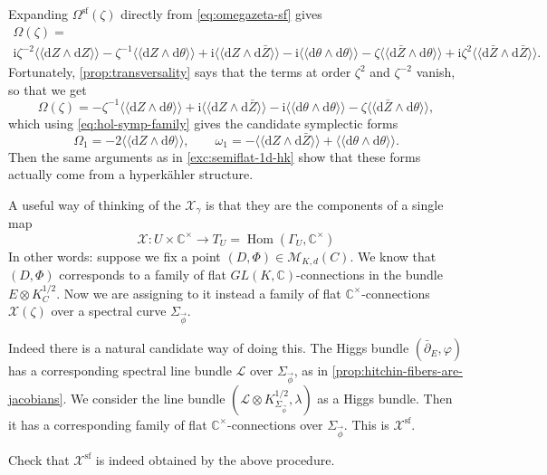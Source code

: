 \documentclass[12pt,letterpaper,reqno]{article}
\numberwithin{equation}{section}
\newcommand{\cL}{\ensuremath{\mathcal L}}
\newcommand{\cM}{\ensuremath{\mathcal M}}
\newcommand{\cX}{\ensuremath{\mathcal X}}
\newcommand{\C}{\ensuremath{\mathbb C}}
\newcommand{\hk}{hyperk\"ahler\xspace}
\newcommand{\I}{{\mathrm i}}
\newcommand{\de}{\mathrm{d}}
\renewcommand{\sf}{\mathrm{sf}}
\newcommand{\DIP}[1]{\langle\!\langle#1\rangle\!\rangle}
\DeclareMathOperator{\Hom}{Hom}
\begin{document}
\begin{pf}
Expanding $\Omega^\sf(\zeta)$ directly from \eqref{eq:omegazeta-sf} gives
\begin{multline}
  \Omega(\zeta) = \\ \I \zeta^{-2} \DIP{\de Z \wedge \de Z} - \zeta^{-1} \DIP{\de Z \wedge \de \theta} + \I \DIP{\de Z \wedge \de \bar{Z}} - \I \DIP{\de \theta \wedge \de \theta} - \zeta \DIP{\de \bar{Z} \wedge \de \theta} + \I \zeta^2 \DIP{\de \bar{Z} \wedge \de \bar{Z}}.
\end{multline}
Fortunately, \autoref{prop:transversality} says that the terms
at order $\zeta^2$ and $\zeta^{-2}$ vanish, so that we get
\begin{equation}
  \Omega(\zeta) = - \zeta^{-1} \DIP{\de Z\wedge \de \theta} + \I \DIP{\de Z\wedge \de \bar{Z}} - \I \DIP{\de \theta\wedge \de \theta} - \zeta \DIP{\de \bar{Z} \wedge \de \theta},
\end{equation}
which using \eqref{eq:hol-symp-family} gives the candidate symplectic forms
\begin{equation}
  \Omega_1 = -2 \DIP{\de Z \wedge \de \theta}, \qquad \omega_1 = - \DIP{\de Z \wedge \de \bar{Z}} + \DIP{\de \theta \wedge \de \theta}.
\end{equation}
Then the same arguments as in \autoref{exc:semiflat-1d-hk}
show that these forms actually come from a \hk structure.
\end{pf}

A useful way of thinking of the $\cX_\gamma$ is that they are the components
of a single map
\begin{equation}
   \cX: U \times \C^\times \to T_U = \Hom(\Gamma_U, \C^\times)
\end{equation}
In other words: suppose we fix a point $(D,\Phi) \in \cM_{K,d}(C)$.
We know that $(D,\Phi)$ corresponds to a family of flat $GL(K,\C)$-connections
in the bundle $E \otimes K_C^{1/2}$. Now we are assigning to it
instead a family of flat $\C^\times$-connections
$\cX(\zeta)$ over a spectral curve $\Sigma_{\vec\phi}$.

Indeed there is a natural candidate way of doing this.
The Higgs bundle $(\bar\partial_E,\varphi)$ has a corresponding
spectral line bundle $\cL$ over $\Sigma_{\vec\phi}$, as
in \autoref{prop:hitchin-fibers-are-jacobians}. We consider
the line bundle $(\cL \otimes K^{1/2}_{\Sigma_{\vec\phi}}, \lambda)$
as a Higgs bundle. Then it has a corresponding family of flat
$\C^\times$-connections over $\Sigma_{\vec\phi}$. This is $\cX^\sf$.

\begin{exercise} Check that $\cX^\sf$ is indeed obtained by the above
procedure.
\end{exercise}
\end{document}
